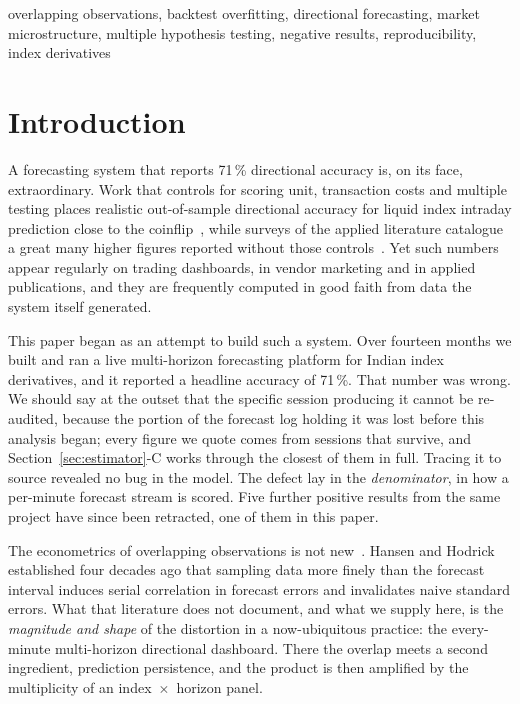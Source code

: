 \documentclass[conference]{IEEEtran}
\begin{document}
\begin{IEEEkeywords}
overlapping observations, backtest overfitting, directional forecasting,
market microstructure, multiple hypothesis testing, negative results,
reproducibility, index derivatives
\end{IEEEkeywords}

\section{Introduction}

A forecasting system that reports 71\,\% directional accuracy is, on its face,
extraordinary. Work that controls for scoring unit, transaction costs and
multiple testing places realistic out-of-sample directional accuracy for liquid
index intraday prediction close to the coinflip~\cite{timmermann2004,sullivan1999},
while surveys of the applied literature catalogue a great many higher figures
reported without those controls~\cite{sezer2020}. Yet such
numbers appear regularly on trading dashboards, in vendor marketing and in
applied publications, and they are frequently computed in good faith from data
the system itself generated.

This paper began as an attempt to build such a system. Over fourteen months we
built and ran a live multi-horizon forecasting platform for Indian index
derivatives, and it reported a headline accuracy of 71\,\%. That number was
wrong. We should say at the outset that the specific session producing it cannot
be re-audited, because the portion of the forecast log holding it was lost
before this analysis began; every figure we quote comes from sessions that
survive, and Section~\ref{sec:estimator}-C works through the closest of them in
full. Tracing it to source revealed no bug in the model. The defect lay in the
\emph{denominator}, in how a per-minute forecast stream is scored. Five further positive results from the same project have since been
retracted, one of them in this paper.

The econometrics of overlapping observations is not
new~\cite{hansen1980,richardson1991}. Hansen and Hodrick~\cite{hansen1980}
established four decades ago that sampling data more finely than the forecast
interval induces serial correlation in forecast errors and invalidates naive
standard errors. What that literature does not document, and what we supply
here, is the \emph{magnitude and shape} of the distortion in a now-ubiquitous
practice: the every-minute multi-horizon directional dashboard. There the
overlap meets a second ingredient, prediction persistence, and the product is
then amplified by the multiplicity of an index~$\times$~horizon panel.
\end{document}
